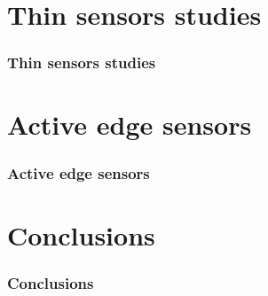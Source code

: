 \section{Thin sensors studies}
\begin{frame}
  \frametitle{Thin sensors studies}
\end{frame}

\section{Active edge sensors}
\begin{frame}
  \frametitle{Active edge sensors}
\end{frame}

\label{lastslide}
\section{Conclusions}
\begin{frame}
  \frametitle{Conclusions}
\end{frame}